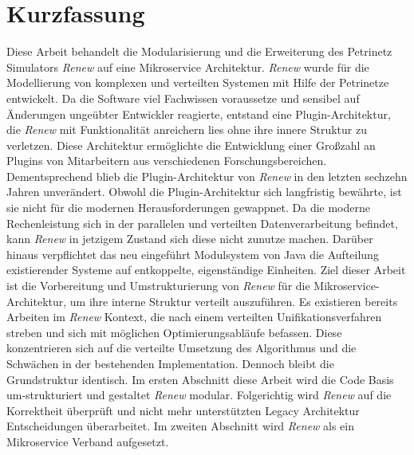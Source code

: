 




\newpage

\chapter*{Kurzfassung}
Diese Arbeit behandelt die Modularisierung und die Erweiterung des Petrinetz Simulators \textit{Renew} auf eine Mikroservice Architektur.
\newline
\textit{Renew} wurde für die Modellierung von komplexen und verteilten Systemen mit Hilfe der Petrinetze entwickelt. 
Da die Software viel Fachwissen voraussetze und sensibel auf Änderungen ungeübter Entwickler reagierte, entstand eine Plugin-Architektur, die \textit{Renew} mit Funktionalität anreichern lies ohne ihre innere Struktur zu verletzen. 
Diese Architektur ermöglichte die Entwicklung einer Großzahl an Plugins von Mitarbeitern aus verschiedenen Forschungsbereichen.
Dementsprechend blieb die Plugin-Architektur von \textit{Renew} in den letzten sechzehn Jahren unverändert.     
\bigbreak
Obwohl die Plugin-Architektur sich langfristig bewährte, ist sie nicht für die modernen Herausforderungen gewappnet. 
Da die moderne Rechenleistung sich in der parallelen und verteilten Datenverarbeitung befindet, kann \textit{Renew} in jetzigem Zustand sich diese nicht zunutze machen. 
Darüber hinaus verpflichtet das neu eingeführt Modulsystem von Java die Aufteilung existierender Systeme auf entkoppelte, eigenständige Einheiten.   
Ziel dieser Arbeit ist die Vorbereitung und Umstrukturierung von \textit{Renew} für die Mikroservice-Architektur, um ihre interne Struktur verteilt auszuführen. 
\bigbreak
Es existieren bereits Arbeiten im \textit{Renew} Kontext, die nach einem verteilten Unifikationsverfahren streben und sich mit möglichen Optimierungsabläufe befassen.
Diese konzentrieren sich auf die verteilte Umsetzung des Algorithmus und die Schwächen in der bestehenden Implementation. Dennoch bleibt die Grundstruktur identisch.
\bigbreak
Im ersten Abschnitt diese Arbeit wird die Code Basis um-strukturiert und gestaltet \textit{Renew} modular. 
Folgerichtig wird \textit{Renew} auf die Korrektheit überprüft und nicht mehr unterstützten Legacy Architektur Entscheidungen überarbeitet. 
Im zweiten Abschnitt wird \textit{Renew} als ein Mikroservice Verband aufgesetzt.

